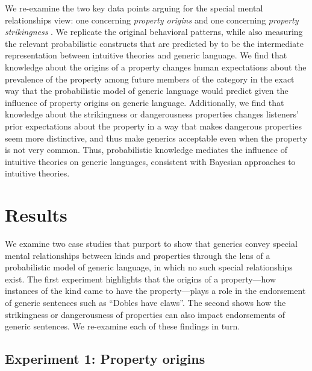 \documentclass[floatsintext, 11pt, doc]{apa6}
\begin{document}
We re-examine the two key data points arguing for the special mental relationships view: one concerning \emph{property origins} \cite{Gelman2007} and one concerning \emph{property strikingness} \cite{Cimpian2010}.%
We replicate the original behavioral patterns, while also measuring the relevant probabilistic constructs that are predicted by  to be the intermediate representation between intuitive theories and generic language. 
We find that knowledge about the origins of a property changes human expectations about the prevalence of the property among future members of the category in the exact way that the probabilistic model of generic language would predict given the influence of property origins on generic language.
Additionally, we find that knowledge about the strikingness or dangerousness properties changes listeners' prior expectations about the property in a way that makes dangerous properties seem more distinctive, and thus make generics acceptable even when the property is not very common.
Thus, probabilistic knowledge mediates the influence of intuitive theories on generic languages, consistent with Bayesian approaches to intuitive theories. 


\section{Results}

We examine two case studies that purport to show that generics convey special mental relationships between kinds and properties through the lens of a probabilistic model of generic language, in which no such special relationships exist. 
The first experiment highlights that the origins of a property---how instances of the kind came to have the property---plays a role in the endorsement of generic sentences such as ``Dobles have claws''.
The second shows how the strikingness or dangerousness of properties can also impact endorsements of generic sentences.
We re-examine each of these findings in turn. 

\subsection{Experiment 1: Property origins}
\end{document}
